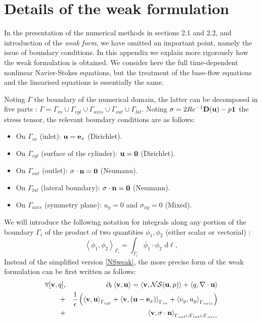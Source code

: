 \documentclass[twocolumn,10pt]{asme2ej}
\begin{document}
\section{Details of the weak formulation}

In the presentation of the numerical methods in sections 2.1 and 2.2, and introduction of the {\em weak form}, we have omitted an important point, namely the issue of boundary conditions. In this appendix we explain more rigorously how the weak formulation is obtained. We consider here the full time-dependent nonlinear Navier-Stokes equations, but the treatment of the base-flow equations and the linearised equations is essentially the same.

Noting $\Gamma$ the boundary of the numerical domain, the latter can be decomposed in five parts : 
$\Gamma = \Gamma_{in} \cup \Gamma_{cyl} \cup \Gamma_{axis} \cup \Gamma_{out} \cup \Gamma_{lat}$. 
Noting $\sigma = 2 Re^{-1} {\bf D}({\bf u}) - p {\bf 1}$ the stress tensor, the relevant boundary conditions are as follows:
\begin{itemize}
\item On $\Gamma_{in}$ (inlet): ${\bf u} = {\bf e}_x$ (Dirichlet).
\item On $\Gamma_{cyl}$ (surface of the cylinder): ${\bf u} = {\bf 0}$ (Dirichlet).
\item On $\Gamma_{out}$ (outlet): $\sigma \cdot {\bf n} = {\bf 0}$ (Neumann). 
\item On $\Gamma_{lat}$ (lateral boundary):  $\sigma \cdot {\bf n} = {\bf 0}$ (Neumann). 
\item On $\Gamma_{axis}$ (symmetry plane): $u_y = 0$ and $\sigma_{xy} = 0$ (Mixed). 
\end{itemize}
We will introduce the following notation for integrals along any portion of the boundary $\Gamma_i$ of the product of two quantities $\phi_1, \phi_2$ (either scalar or vectorial) :
$$
\left< \phi_1, \phi_2 \right>_{\Gamma_i} = \int_{\Gamma_i}  \overline{\phi}_1 \cdot \phi_2   \mbox{ d} \ell,
$$
Instead of the simplified version \ref{NSweak}, the more precise form of the weak formulation can be first written as follows:
\begin{eqnarray}
\label{NSweakFull}
\forall [{\bf v},q], &&\quad \partial_t \left< {\bf v}, {\bf u}\right> = \left< {\bf v} , {\cal NS} ({\bf u},p) \right> + \left< q, \nabla \cdot {\bf u}\right>\\
+ &&\frac{1}{\epsilon} \left(  \left< {\bf v}, \bf{u} \right>_{\Gamma_{cyl}} + \left< {\bf v}, ({\bf u}- {\bf e}_x ) \right>_{\Gamma_{in}} 
+ \left< v_y, u_y\right>_{\Gamma_{axis}} \right) \nonumber \\
+ && \left< {\bf v}, \sigma \cdot {\bf n} \right>_{\Gamma_{out} \cup  \Gamma_{lat} \cup \Gamma_{axis} }  \nonumber 
\end{eqnarray}
\end{document}
